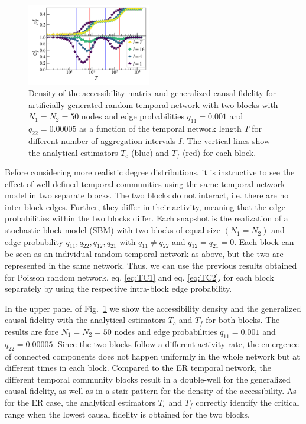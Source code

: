 \documentclass[%
 reprint,
 amsmath,amssymb,
 aps,
]{revtex4-2}
\newcommand{\fla}[1]{\textcolor{red}{flavio says: #1}}
\begin{document}
\begin{figure}[]
\includegraphics[width=0.48\textwidth]{fig/SBM_cr.png}

\caption{\label{fig:SBMcf} 
Density of the accessibility matrix and
generalized causal fidelity for artificially generated random temporal network with two blocks with $N_1=N_2=50$ nodes and edge probabilities $q_{11}=0.001 $ and $q_{22}=0.00005$ as a function of the temporal network length $T$ for different number of aggregation intervals $I$.
The vertical lines show the analytical estimators $T_c$ (blue) and $T_f$ (red) for each block.
}
\end{figure}

Before considering more realistic degree distributions, it is instructive to see the effect of well defined temporal communities using the same temporal network model in two separate blocks. The two blocks do not interact, i.e. there are no inter-block edges. Further, they differ in their activity, meaning that the edge-probabilities within the two blocks differ.  
Each snapshot is the realization of a stochastic block model (SBM) with two blocks of equal size $(N_1=N_2)$ and edge probability  $q_{11},q_{22},q_{12},q_{21}$ with $q_{11}\neq q_{22}$ and $q_{12}=q_{21}=0$.  Each block can be seen as an individual random temporal network as above, but the two are represented in the same network. Thus, we can use the previous results obtained for Poisson random network, eq. \ref{eq:TC1}  and eq.  \ref{eq:TC2}, for each block separately by using the respective intra-block edge probability.  

In the upper panel of Fig.~\ref{fig:SBMcf} we show the accessibility density and the generalized causal fidelity with the analytical estimators $T_c$ and $T_f$ for both blocks. The results are fore
$N_1=N_2=50$ nodes and edge probabilities $q_{11}=0.001 $ and $q_{22}=0.00005$.
Since the two blocks follow a different activity rate, the emergence of connected components does not happen uniformly in the whole network but at different times in each block. Compared to the ER temporal network, the different temporal community blocks result in a double-well for the generalized causal fidelity, as well as in a stair pattern for the density of the accessibility. 
As for the ER case, the analytical estimators $T_c$ and $T_f$ correctly identify the critical range when the lowest causal fidelity is obtained for  the two blocks.
\end{document}
